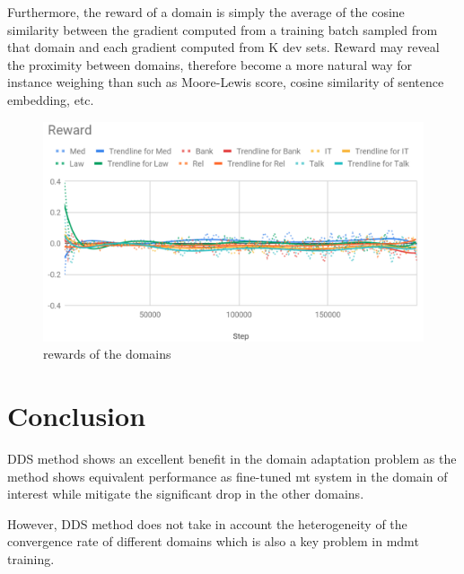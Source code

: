 \documentclass[12pt,times,a4paper,twoside]{article}
\theoremstyle{definition}
\begin{document}
Furthermore, the reward of a domain is simply the average of the cosine similarity between the gradient computed from a training batch sampled from that domain and each gradient computed from K dev sets. Reward may reveal the proximity between domains, therefore become a more natural way for instance weighing than such as Moore-Lewis score,
cosine similarity of sentence embedding, etc.

\begin{figure}[h!]
\includegraphics[width=\linewidth]{reward.png}
\caption{rewards of the domains}
\label{fig:reward}
\end{figure}

\section{Conclusion}
DDS method shows an excellent benefit in the domain adaptation problem as the method shows equivalent performance as fine-tuned mt system in the domain of interest while mitigate the significant drop in the other domains.

However, DDS method does not take in account the heterogeneity of the convergence rate of different domains which is also a key problem in mdmt training.


\end{document}

